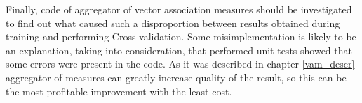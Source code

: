Finally, code of aggregator of vector association measures should be investigated to find out what caused such a disproportion between results
obtained during training and performing Cross-validation. Some misimplementation is likely to be an explanation, taking into consideration, 
that performed unit tests showed that some errors were present in the code. As it was described in chapter \ref{vam_descr} aggregator of measures 
can greatly increase quality of the result, so this can be the most profitable improvement with the least cost.






